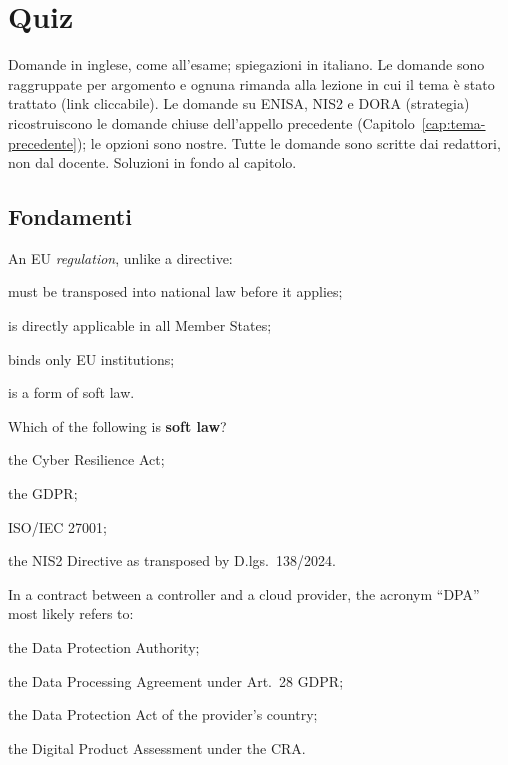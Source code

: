 \chapter{Quiz}
\label{cap:quiz}

\begin{nota}
Domande in inglese, come all'esame; spiegazioni in italiano. Le domande sono raggruppate per argomento
e ognuna rimanda alla lezione in cui il tema è stato trattato (link cliccabile). Le domande su ENISA,
NIS2 e DORA (strategia) ricostruiscono le domande chiuse dell'appello precedente
(Capitolo~\ref{cap:tema-precedente}); le opzioni sono nostre. Tutte le domande sono scritte dai
redattori, non dal docente. Soluzioni in fondo al capitolo.
\end{nota}

\section{Fondamenti}

\begin{domanda}\label{q:regolamento}
An EU \emph{regulation}, unlike a directive:
\begin{opzioni}
  \item must be transposed into national law before it applies;
  \item is directly applicable in all Member States;
  \item binds only EU institutions;
  \item is a form of soft law.
\end{opzioni}
\end{domanda}

\begin{domanda}\label{q:softlaw}
Which of the following is \textbf{soft law}?
\begin{opzioni}
  \item the Cyber Resilience Act;
  \item the GDPR;
  \item ISO/IEC 27001;
  \item the NIS2 Directive as transposed by D.lgs.~138/2024.
\end{opzioni}
\end{domanda}

\begin{domanda}\label{q:dpa}
In a contract between a controller and a cloud provider, the acronym ``DPA'' most likely refers to:
\begin{opzioni}
  \item the Data Protection Authority;
  \item the Data Processing Agreement under Art.~28 GDPR;
  \item the Data Protection Act of the provider's country;
  \item the Digital Product Assessment under the CRA.
\end{opzioni}
\end{domanda}

